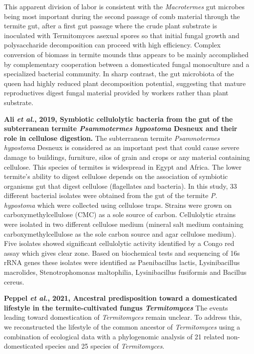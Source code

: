 \documentclass[11pt]{article}
\begin{document}
\begin{sloppypar}
This apparent division of labor is consistent with the \textit{Macrotermes} gut microbes being most important during the second passage of comb material through the termite gut, after a first gut passage where the crude plant substrate is inoculated with Termitomyces asexual spores so that initial fungal growth and polysaccharide decomposition can proceed with high efficiency. 
Complex conversion of biomass in termite mounds thus appears to be mainly accomplished by complementary cooperation between a domesticated fungal monoculture and a specialized bacterial community. 
In sharp contrast, the gut microbiota of the queen had highly reduced plant decomposition potential, suggesting that mature reproductives digest fungal material provided by workers rather than plant substrate.
\par
\textbf{Ali \textit{et al.}, 2019, Symbiotic cellulolytic bacteria from the gut of the subterranean termite \textit{Psammotermes hypostoma} Desneux and their role in cellulose digestion.} \newline
The subterranean termite \textit{Psammotermes hypostoma} Desneux is considered as an important pest that could cause severe damage to buildings, furniture, silos of grain and crops or any material containing cellulose. 
This species of termites is widespread in Egypt and Africa. 
The lower termite’s ability to digest cellulose depends on the association of symbiotic organisms gut that digest cellulose (flagellates and bacteria). 
In this study, 33 different bacterial isolates were obtained from the gut of the termite \textit{P. hypostoma} which were collected using cellulose traps. 
Strains were grown on carboxymethylcellulose (CMC) as a sole source of carbon. 
Cellulolytic strains were isolated in two different cellulose medium (mineral salt medium containing carboxymethylcellulose as the sole carbon source and agar cellulose medium). 
Five isolates showed significant cellulolytic activity identified by a Congo red assay which gives clear zone. 
Based on biochemical tests and sequencing of 16s rRNA genes these isolates were identified as Paenibacillus lactis, Lysinibacillus macrolides, Stenotrophomonas maltophilia, Lysinibacillus fusiformis and Bacillus cereus.
\par
\textbf{Peppel \textit{et al.}, 2021, Ancestral predisposition toward a domesticated lifestyle in the termite-cultivated fungus \textit{Termitomyces}} \newline
The events leading toward domestication of \textit{Termitomyces} remain unclear. 
To address this, we reconstructed the lifestyle of the common ancestor of \textit{Termitomyces} using a combination of ecological data with a phylogenomic analysis of 21 related non-domesticated species and 25 species of \textit{Termitomyces}. 

\end{sloppypar}
\end{document}

